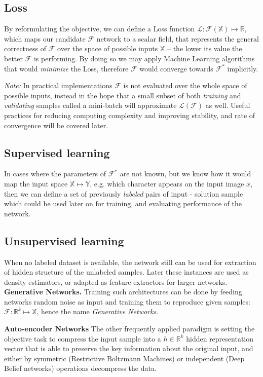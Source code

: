 \subsection{Loss} 
By reformulating the objective, we can define a Loss function $\mathcal{L}:\mathcal{F}(\mathbb{X}) \mapsto \mathbb{R}$,
which maps our candidate $\mathcal{F}$ network to a scalar field, that represents the general correctness of $\mathcal{F}$ over the space of possible inputs $\mathbb{X}$ -- the lower its value the better $\mathcal{F}$ is performing.
By doing so we may apply Machine Learning algorithms that would \emph{minimize} the Loss, therefore $\mathcal{F}$ would converge towards $\mathcal{F}^*$ implicitly.

\emph{Note:} In practical implementations $\mathcal{F}$ is not evaluated over the whole space of possible inputs, instead in the hope that a small subset of both \emph{training} and \emph{validating} samples called a mini-batch will approximate $\mathcal{L}(\mathcal{F})$ as well. Useful practices for reducing computing complexity and improving stability, and rate of convergence will be covered later.


\subsection{Supervised learning}
In cases where the parameters of $\mathcal{F}^*$ are not known,
but we know how it would map the input space $\mathbb{X} \mapsto
\mathbb{Y}$, e.g. which character appears on the input image $x$, 
then we  can define a set of previously \emph{labeled} pairs of input - 
solution sample which could be used later on for training, and
evaluating performance of the network.

\subsection{Unsupervised learning}
When no labeled dataset is available, the network still can be used for extraction of hidden structure of the unlabeled samples. Later these instances are used as density estimators, or adapted as feature extractors for larger networks.
\textbf{Generative Networks.} Training such architectures can be done by feeding networks random noise as input and training them to reproduce given samples: $\mathcal{F}:\mathbb{R}^k \mapsto \mathbb{X}$, hence the name \emph{Generative Networks}.

\textbf{Auto-encoder Networks} The other frequently applied paradigm is setting the objective task to compress the input sample into a $h \in \mathbb{R}^k$ hidden representation vector that is able to preserve the key information about the original input, and either by symmetric (Restrictive Boltzmann Machines) or independent (Deep Belief networks) operations decompress the data.

